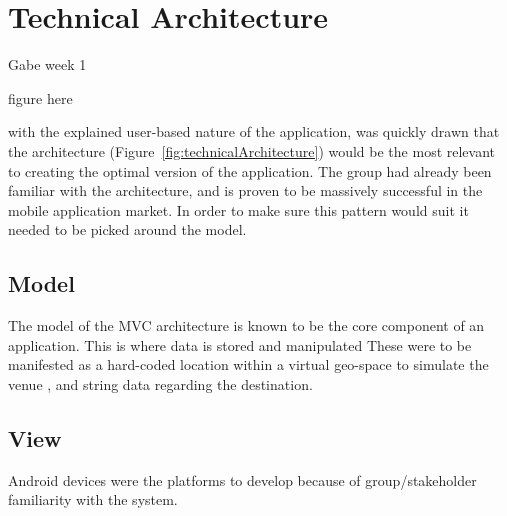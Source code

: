 \section{Technical Architecture}
Gabe week 1

figure here

  with the explained user-based nature of the application,  was quickly drawn that the  architecture (Figure~\ref{fig:technicalArchitecture}) would be the most relevant to creating the  optimal version of the application. The group had already been familiar with the architecture, and  is proven to be massively successful in the mobile application market. In order to make sure this pattern would suit it  needed to be picked around the model. 

\subsection{Model}
The model of the MVC architecture is known to be the core component of an application. This is where data is stored and manipulated  These were to be manifested as a hard-coded location within a virtual geo-space  to simulate the venue , and string data regarding the destination.

\subsection{View}
Android devices were the  platforms to develop  because of group/stakeholder familiarity with the system. 

